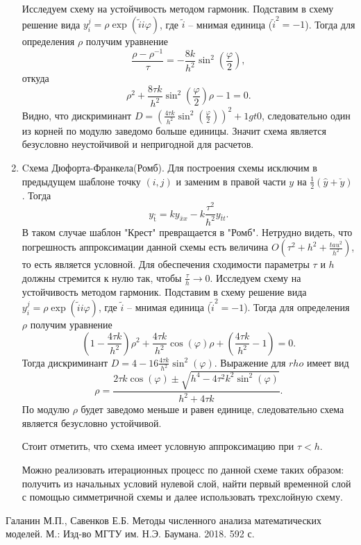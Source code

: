 \documentclass[12pt, a4paper]{article}
\renewcommand{\phi}{\varphi}
\newcommand{\widecheck}[1]{\check{#1}}
\newcommand{\down}[1]{\widecheck{#1}}
\newcommand{\pon}[1]{\mathop {#1}\limits^ \circ}
\begin{document}
\begin{enumerate}
		Исследуем схему на устойчивость методом гармоник. Подставим в схему решение вида $y_i^j = \rho \exp{(\widetilde{i} i \phi)}$, где $\widetilde{i}$ -- мнимая единица ($\widetilde{i}^2 = -1$). Тогда для определения $\rho$ получим уравнение
		\begin{equation*}
			\frac{\rho-\rho^{-1}}{\tau} = -\frac{8k}{h^2}\sin^2(\frac{\phi}{2}),
		\end{equation*}
		откуда
		\begin{equation*}
		\rho^2 + \frac{8\tau k}{h^2} \sin^2(\frac{\phi}{2}) \rho - 1 = 0.
		\end{equation*}
		Видно, что дискриминант $D = (\frac{4\tau k}{h^2} \sin^2(\frac{\phi}{2}))^2 + 1 gt 0$, следовательно один из корней по модулю заведомо больше единицы. Значит схема является безусловно неустойчивой и непригодной для расчетов.
		\item Cхема Дюфорта-Франкела(Ромб).
		Для построения схемы исключим в предыдущем шаблоне точку $(i, j)$ и заменим в правой части $y$ на $\frac{1}{2}(\hat{y} + \down{y})$. Тогда
		\begin{equation*}
			y_{\pon{t}} = k y_{\bar{x}x} - k \frac{\tau^2}{h^2} y_{\bar{t}t}.
		\end{equation*}
		В таком случае шаблон "Крест" превращается в "Ромб". Нетрудно видеть, что погрешность аппроксимации данной схемы есть величина $O(\tau^2 + h^2 + \frac{tau^2}{h^2})$, то есть является условной. Для обеспечения сходимости параметры $\tau$ и $h$ должны стремится к нулю так, чтобы $\frac{\tau}{h} \to 0$. 
		Исследуем схему на устойчивость методом гармоник. Подставим в схему решение вида $y_i^j = \rho \exp{(\widetilde{i} i \phi)}$, где $\widetilde{i}$ -- мнимая единица ($\widetilde{i}^2 = -1$). Тогда для определения $\rho$ получим уравнение
		\begin{equation*}
			(1 - \frac{4 \tau k}{h^2}) \rho^2 + \frac{4 \tau k} {h^2} \cos(\phi) \rho + (\frac{4 \tau k} {h^2} - 1) = 0.
		\end{equation*}
		Тогда дискриминант $D = 4 - 16 \frac{4 \tau k} {h^2} \sin^2(\phi)$. Выражение для $rho$ имеет вид
		\begin{equation*}
			\rho = \frac{2 \tau k \cos(\phi) \pm \sqrt{h^4 - 4\tau^2 k^2 \sin^2(\phi)}}{h^2 + 4\tau k}.
		\end{equation*}
		По модулю $\rho$ будет заведомо меньше и равен единице, следовательно схема является безусловно устойчивой. 
		
		Стоит отметить, что схема имеет условную аппроксимацию при $\tau < h$.
		
		
		Можно реализовать итерационных процесс по данной схеме таких образом: получить из начальных условий нулевой слой, найти первый временной слой с помощью симметричной схемы и далее использовать трехслойную схему.
	\end{enumerate}
	
	
	
	\clearpage
	\begin{thebibliography}{1}
		 Галанин М.П., Савенков Е.Б. Методы численного анализа математических моделей. М.: Изд-во МГТУ им. Н.Э. Баумана. 2018. 592 с.
		
	\end{thebibliography}
	
\end{document}
